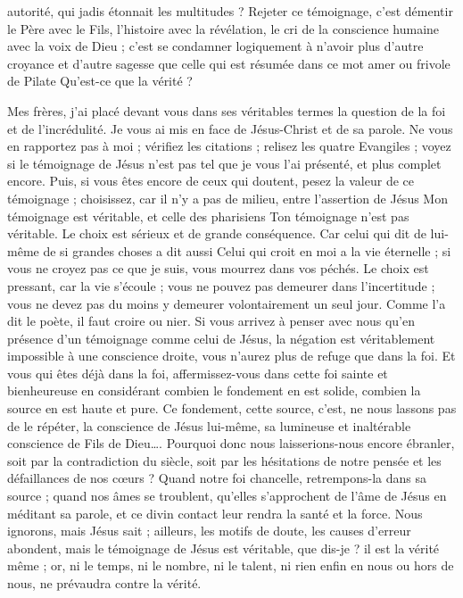 autorité, qui jadis étonnait les multitudes ? Rejeter ce témoignage, c’est démentir le Père avec le Fils, l’histoire avec la révélation, le cri de la conscience humaine avec la voix de Dieu ; c’est se condamner logiquement à n’avoir plus d’autre croyance et d’autre sagesse que celle qui est résumée dans ce mot amer ou frivole de Pilate\frcolon{} \Og{} Qu’est-ce que la vérité ?\Fg{}

Mes frères, j’ai placé devant vous dans ses véritables termes la question de la foi et de l’incrédulité. Je vous ai mis en face de Jésus-Christ et de sa parole. Ne vous en rapportez pas à moi ; vérifiez les citations ; relisez les quatre Evangiles ; voyez si le témoignage de Jésus n’est pas tel que je vous l’ai présenté, et plus complet encore. Puis, si vous êtes encore de ceux qui doutent, pesez la valeur de ce témoignage ; choisissez, car il n’y a pas de milieu, entre l’assertion de Jésus\frcolon{} \Og{} Mon témoignage est véritable\Fg{}, et celle des pharisiens\frcolon{} \Og{} Ton témoignage n’est pas véritable.\Fg{} Le choix est sérieux et de grande conséquence. Car celui qui dit de lui-même de si grandes choses a dit aussi\frcolon{} \Og{} Celui qui croit en moi a la vie éternelle ; si vous ne croyez pas ce que je suis, vous mourrez dans vos péchés.\Fg{} Le choix est pressant, car la vie s’écoule ; vous ne pouvez pas demeurer dans l’incertitude ; vous ne devez pas du moins y demeurer volontairement un seul jour. Comme l’a dit le poète, il faut croire ou nier. Si vous arrivez à penser avec nous qu’en présence d’un témoignage comme celui de Jésus, la négation est véritablement impossible à une conscience droite, vous n’aurez plus de refuge que dans la foi. Et vous qui êtes déjà dans la foi, affermissez-vous dans cette foi sainte et bienheureuse en considérant combien le fondement en est solide, combien la source en est haute et pure. Ce fondement, cette source, c’est, ne nous lassons pas de le répéter, la conscience de Jésus lui-même, sa lumineuse et inaltérable conscience de Fils de Dieu…. Pourquoi donc nous laisserions-nous encore ébranler, soit par la contradiction du siècle, soit par les hésitations de notre pensée et les défaillances de nos cœurs ? Quand notre foi chancelle, retrempons-la dans sa source ; quand nos âmes se troublent, qu’elles s’approchent de l’âme de Jésus en méditant sa parole, et ce divin contact leur rendra la santé et la force. Nous ignorons, mais Jésus sait ; ailleurs, les motifs de doute, les causes d’erreur abondent, mais le témoignage de Jésus est véritable, que dis-je ? il est la vérité même ; or, ni le temps, ni le nombre, ni le talent, ni rien enfin en nous ou hors de nous, ne prévaudra contre la vérité.

